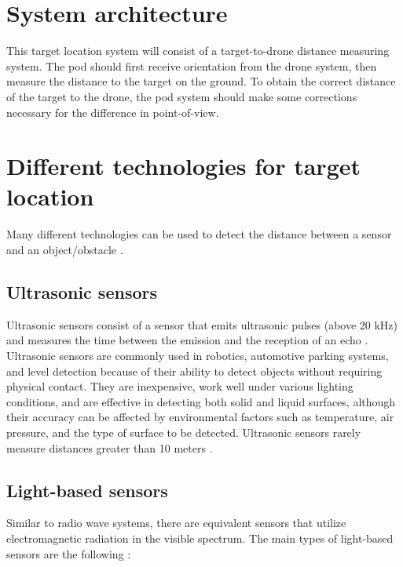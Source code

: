 \section{System architecture}

This target location system will consist of a target-to-drone distance measuring system.
The pod should first receive orientation from the drone system, then measure the
distance to the target on the ground. To obtain the correct distance of the target to
the drone, the pod system should make some corrections necessary for the difference in point-of-view.

\section{Different technologies for target location}

Many different technologies can be used to detect the distance between a sensor and an object/obstacle
\cite{robotsens}.

\subsection{Ultrasonic sensors}

Ultrasonic sensors consist of a sensor that emits ultrasonic pulses (above 20 kHz)
and measures the time between the emission and the reception of an echo \cite{ultrasound1}.
Ultrasonic sensors are commonly used in robotics, automotive parking systems, and level detection
because of their ability to detect objects without requiring physical contact. They are inexpensive,
work well under various lighting conditions, and are effective in detecting both solid and liquid
surfaces, although their accuracy can be affected by environmental factors such as temperature,
air pressure, and the type of surface to be detected. Ultrasonic sensors rarely measure distances
greater than 10 meters \cite{ultrasound2}.

\subsection{Light-based sensors}

Similar to radio wave systems, there are equivalent sensors that utilize electromagnetic radiation
in the visible spectrum. The main types of light-based sensors are the following
 \cite{infrared}\cite{laserrangefinder}:

